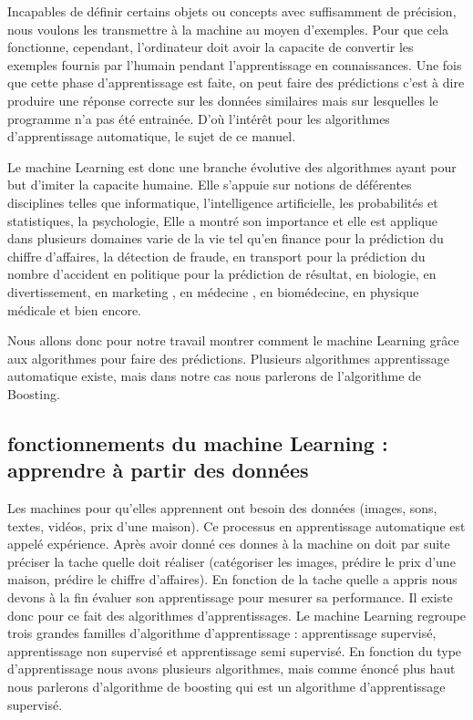 \documentclass[french,a4paper,12pt]{article}
\begin{document}
\quad Incapables de définir certains objets ou concepts avec suffisamment de précision, nous voulons les transmettre à la machine au moyen d'exemples. Pour que cela fonctionne, cependant, l'ordinateur doit avoir la capacite de convertir les exemples fournis par l’humain pendant l’apprentissage en connaissances. Une fois que cette phase d’apprentissage est faite, on peut faire des prédictions c’est à dire produire une réponse correcte sur les données similaires mais sur lesquelles le programme n’a pas été entrainée.   D'où l’intérêt pour les algorithmes d’apprentissage automatique, le sujet de ce manuel.

\quad Le machine Learning est donc une branche évolutive des algorithmes ayant pour but d’imiter la capacite humaine. Elle s’appuie sur notions de déférentes disciplines telles que informatique, l’intelligence artificielle, les probabilités et statistiques, la psychologie,  Elle a montré son importance et elle est applique dans plusieurs domaines varie de la vie tel qu’en finance pour la prédiction du chiffre d’affaires, la détection de fraude, en transport pour la prédiction du nombre d’accident en politique pour la prédiction de résultat, en biologie, en divertissement, en marketing , en médecine , en biomédecine, en physique médicale et bien encore.



\quad Nous allons donc pour notre travail montrer comment le machine Learning grâce aux algorithmes pour faire des prédictions. Plusieurs algorithmes apprentissage automatique existe, mais dans notre cas nous parlerons de l’algorithme de Boosting.

\subsection{ fonctionnements du machine Learning : apprendre à partir des données }

\quad Les machines pour qu’elles apprennent ont besoin des données (images, sons, textes, vidéos, prix d’une maison). Ce processus en apprentissage automatique est appelé expérience. Après avoir donné ces donnes à la machine on doit par suite préciser la tache quelle doit réaliser (catégoriser les images, prédire le prix d’une maison, prédire le chiffre d’affaires). En fonction de la tache quelle a appris nous devons à la fin évaluer son apprentissage pour mesurer sa performance. Il existe donc pour ce fait des algorithmes d’apprentissages. Le machine Learning regroupe trois grandes familles d’algorithme d’apprentissage : apprentissage supervisé, apprentissage non supervisé et apprentissage semi supervisé. En fonction du type d’apprentissage nous avons plusieurs algorithmes, mais comme énoncé plus haut nous parlerons d’algorithme de boosting qui est un algorithme d’apprentissage supervisé. 
\end{document}
